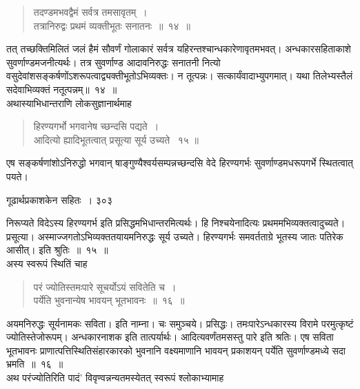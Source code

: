\documentclass[11pt, openany]{book}
\begin{document}
\begin{quote}
{\ssi तदण्डमभवद्वैमं सर्वत्र तमसावृतम्~।\\
तत्रानिरुद्वः प्रथमं व्यक्तीभूतः सनातनः~॥~१४~॥ }
\end{quote}

 तत् तच्छक्तिमिलितं जलं हैमं सौवर्णं गोलाकारं सर्वत्र यहिरन्तश्चान्धकारेणावृतमभवत्। अन्धकारसहिताकाशे सुवर्णाण्डमजनीत्यर्थः। तत्र सुवर्णाण्ड आदावनिरुद्धः सनातनी नित्यो वसुदेवांशसङ्कर्षणोंऽशरूपत्वाद्व्यक्तीभूतोऽभिव्यक्तः। न तूत्पन्नः। सत्कार्यंवादाभ्युपगमात्। यथा तिलेभ्यस्तैलं सदेवाभिव्यक्तं नतूत्पन्नम्॥~१४~॥\\
 \noindent अथास्याभिधान्तराणि लोकसुज्ञानार्थमाह \textendash

\begin{quote}
{\ssi हिरण्यगर्भो भगवानेष च्छन्दसि पद्यते~।\\
 आदित्यो ह्यादिभूतत्वात् प्रसूत्या सूर्य उच्यते~ १५ ॥ }
\end{quote}

 एष सङ्कर्षणांशोऽनिरुद्धो भगवान् षाङ्गुण्यैश्वर्यसम्पन्नच्छन्दसि वेदे हिरण्यगर्भः सुवर्णाण्डमधरूपगर्भे स्थितत्वात् पयते।


\newpage

\hspace{3cm} गूढार्थप्रकाशकेन सहितः~। \hfill ३०३
\vspace{1cm}


\noindent निरूप्यते विदेऽस्य हिरण्यगर्भ इति प्रसिद्धमभिधान्तरमित्यर्थः। हि निश्चयेनादित्यः प्रथममभिव्यक्तत्वादुच्यते। प्रसूत्या। अस्माज्जगतोऽभिव्यक्ततयायमनिरुद्धः सूर्य उच्यते। हिरण्यगर्भः समवर्तताग्रे भूतस्य जातः पतिरेक आसीत्। इति श्रुतिः~॥~१५~॥\\
\noindent अस्य स्वरूपं स्थितिं चाह \textendash

\begin{quote}
{\ssi परं ज्योतिस्तमःपारे सूचर्योऽयं सवितेति च~।\\
पर्येति भुवनान्येष भावयन् भूतभावनः~॥~१६~॥ }
\end{quote}

 अयमनिरुद्धः सूर्यनामकः सविता। इति नाम्ना। चः समुञ्चये। प्रसिद्धः। तमःपारेऽन्धकारस्य विरामे परमुत्कृष्टं ज्योतिस्तेजोरूपम्। अन्धकारनाशक इति तात्पर्यार्थः। आदित्यवर्णंतमसस्तु पारे इति श्रतिः। एष सविता भूतभावनः प्राणात्पत्तिस्थितिसंहारकारको भुवनानि वक्ष्यमाणानि भावयन् प्रकाशयन् पर्येति सुवर्णाण्डमध्ये सदा भ्रमति~॥~१६~॥\\
 \noindent अथ परंज्योतिरिति पादं' विवृण्वन्नन्यतमस्येतत् स्वरूपं श्लोकाभ्यामाह \textendash
\end{document}
